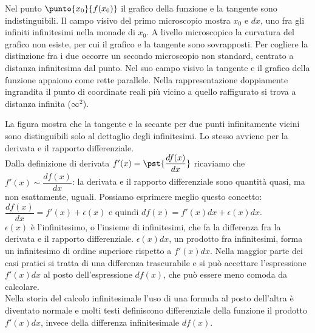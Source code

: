 \begin{inaccessibleblock}
  \begin{minipage}[]{.47\textwidth}
    \begin{center} \derivata \end{center}
 \end{minipage} 
  \hfill
 \begin{minipage}[]{.47\textwidth} \vspace{2.5em}
Nel punto $\punto{x_0}{f(x_0)}$ il grafico della funzione e la tangente
sono indistinguibili. 
Il campo visivo del primo microscopio mostra ${x_0}$ e $dx$, 
uno fra gli infiniti infinitesimi nella monade di $x_0$. A livello 
microscopico la curvatura del grafico non esiste,  per cui il grafico e la 
tangente sono sovrapposti. Per cogliere la distinzione fra i due occorre 
un secondo microscopio non standard, centrato a distanza infinitesima dal 
punto. Nel suo campo visivo la tangente e il grafico della funzione 
appaiono come rette parallele. Nella rappresentazione doppiamente ingrandita
il punto di coordinate reali più vicino a quello raffigurato  si trova a 
distanza infinita ($\infty^2$).
 \end{minipage}
\end{inaccessibleblock}
\label{}
La figura mostra che la tangente e la secante per due punti infinitamente 
vicini sono distinguibili solo al dettaglio degli infinitesimi. Lo 
stesso avviene per la derivata e il rapporto differenziale.\\
Dalla definizione di derivata $f'(x)=\pst{\dfrac{df(x)}{dx}}$ ricaviamo che
$f'(x)\sim \dfrac{df(x)}{dx}$: la derivata e il rapporto differenziale 
sono quantità quasi, ma non esattamente, uguali. Possiamo esprimere 
meglio questo concetto:\\
$\dfrac{df(x)}{dx}=f'(x)+\epsilon(x)$ e quindi $df(x)=f'(x)dx+\epsilon(x)dx$.\\
$\epsilon(x)$ è l'infinitesimo, o l'insieme di infinitesimi, che fa la 
differenza fra la derivata e il rapporto differenziale.  
$\epsilon(x)dx$, un prodotto fra infinitesimi, forma un infinitesimo 
di ordine superiore rispetto a $f'(x)dx$.
Nella maggior parte dei casi pratici si tratta di una differenza trascurabile 
e si può accettare l'espressione $f'(x)dx$ al posto dell'espressione
$df(x)$, che può essere meno comoda da calcolare.\\
Nella storia del calcolo infinitesimale l'uso di una formula al posto dell'altra
è diventato normale e molti testi definiscono differenziale della 
funzione il prodotto $f'(x)dx$, invece della differenza infinitesimale 
$df(x)$.

